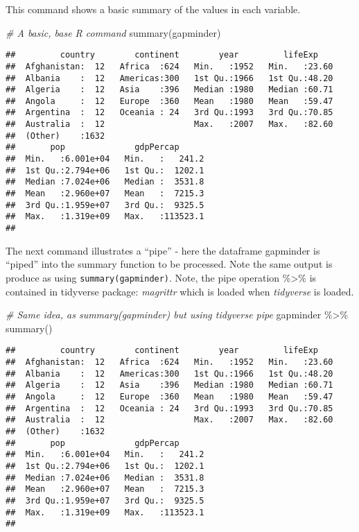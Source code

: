 \documentclass[
]{book}
\newenvironment{Shaded}{\begin{snugshade}}{\end{snugshade}}
\newcommand{\CommentTok}[1]{\textcolor[rgb]{0.56,0.35,0.01}{\textit{#1}}}
\newcommand{\FunctionTok}[1]{\textcolor[rgb]{0.00,0.00,0.00}{#1}}
\newcommand{\NormalTok}[1]{#1}
\newcommand{\SpecialCharTok}[1]{\textcolor[rgb]{0.00,0.00,0.00}{#1}}
\begin{document}
This command shows a basic summary of the values in each variable.

\begin{Shaded}
\begin{Highlighting}[]
\CommentTok{\# A basic, base R command}
\FunctionTok{summary}\NormalTok{(gapminder)}
\end{Highlighting}
\end{Shaded}

\begin{verbatim}
##         country        continent        year         lifeExp     
##  Afghanistan:  12   Africa  :624   Min.   :1952   Min.   :23.60  
##  Albania    :  12   Americas:300   1st Qu.:1966   1st Qu.:48.20  
##  Algeria    :  12   Asia    :396   Median :1980   Median :60.71  
##  Angola     :  12   Europe  :360   Mean   :1980   Mean   :59.47  
##  Argentina  :  12   Oceania : 24   3rd Qu.:1993   3rd Qu.:70.85  
##  Australia  :  12                  Max.   :2007   Max.   :82.60  
##  (Other)    :1632                                                
##       pop              gdpPercap       
##  Min.   :6.001e+04   Min.   :   241.2  
##  1st Qu.:2.794e+06   1st Qu.:  1202.1  
##  Median :7.024e+06   Median :  3531.8  
##  Mean   :2.960e+07   Mean   :  7215.3  
##  3rd Qu.:1.959e+07   3rd Qu.:  9325.5  
##  Max.   :1.319e+09   Max.   :113523.1  
## 
\end{verbatim}

The next command illustrates a ``pipe'' - here the dataframe gapminder is ``piped'' into
the summary function to be processed. Note the same output is produce as using
\texttt{summary(gapminder)}. Note, the pipe operation \%\textgreater\% is contained in tidyverse package: \emph{magrittr} which is loaded when \emph{tidyverse} is loaded.

\begin{Shaded}
\begin{Highlighting}[]
\CommentTok{\# Same idea, as summary(gapminder) but using tidyverse pipe}
\NormalTok{gapminder }\SpecialCharTok{\%\textgreater{}\%} \FunctionTok{summary}\NormalTok{()}
\end{Highlighting}
\end{Shaded}

\begin{verbatim}
##         country        continent        year         lifeExp     
##  Afghanistan:  12   Africa  :624   Min.   :1952   Min.   :23.60  
##  Albania    :  12   Americas:300   1st Qu.:1966   1st Qu.:48.20  
##  Algeria    :  12   Asia    :396   Median :1980   Median :60.71  
##  Angola     :  12   Europe  :360   Mean   :1980   Mean   :59.47  
##  Argentina  :  12   Oceania : 24   3rd Qu.:1993   3rd Qu.:70.85  
##  Australia  :  12                  Max.   :2007   Max.   :82.60  
##  (Other)    :1632                                                
##       pop              gdpPercap       
##  Min.   :6.001e+04   Min.   :   241.2  
##  1st Qu.:2.794e+06   1st Qu.:  1202.1  
##  Median :7.024e+06   Median :  3531.8  
##  Mean   :2.960e+07   Mean   :  7215.3  
##  3rd Qu.:1.959e+07   3rd Qu.:  9325.5  
##  Max.   :1.319e+09   Max.   :113523.1  
## 
\end{verbatim}
\end{document}
